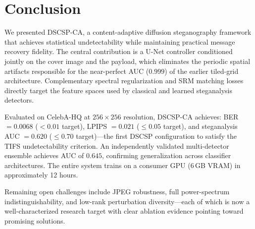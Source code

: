 \documentclass[journal]{IEEEtran}
\begin{document}
\section{Conclusion}
\label{sec:conclusion}

We presented DSCSP-CA, a content-adaptive diffusion steganography framework that achieves
statistical undetectability while maintaining practical message recovery fidelity.
The central contribution is a U-Net controller conditioned jointly on the cover image and
the payload, which eliminates the periodic spatial artifacts responsible for the near-perfect
AUC ($0.999$) of the earlier tiled-grid architecture.
Complementary spectral regularization and SRM matching losses directly target the feature
spaces used by classical and learned steganalysis detectors.

Evaluated on CelebA-HQ at $256\times256$ resolution, DSCSP-CA achieves:
BER $= 0.0068$ ($<0.01$ target), LPIPS $= 0.021$ ($\leq 0.05$ target),
and steganalysis AUC $= 0.620$ ($\leq 0.70$ target)---the first DSCSP configuration to
satisfy the TIFS undetectability criterion.
An independently validated multi-detector ensemble achieves AUC of $0.645$, confirming
generalization across classifier architectures.
The entire system trains on a consumer GPU (6\,GB VRAM) in approximately 12 hours.

Remaining open challenges include JPEG robustness, full power-spectrum indistinguishability,
and low-rank perturbation diversity---each of which is now a well-characterized research
target with clear ablation evidence pointing toward promising solutions.
\end{document}
